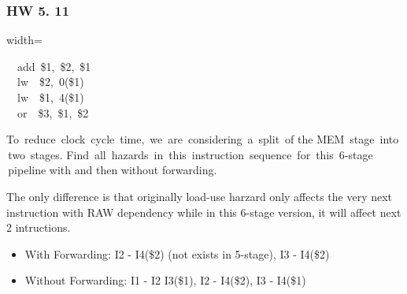\documentclass[xcolor=table]{beamer}
\begin{document}
\begin{mdframe}%

\frametitle{HW 5. 11}\label{heading-sec-hw-5-11}%

\begin{mdblock}{width=}%
\begin{mdpre}%
\noindent~~{add}~\$1,~\$2,~\$1\\
~~{lw}~~\$2,~{0}(\$1)\\
~~{lw}~~\$1,~{4}(\$1)\\
~~{or}~~\$3,~\$1,~\$2%
\end{mdpre}%
\end{mdblock}%

\noindent{} To  reduce  clock  cycle  time,  we  are  considering  a  split  of the MEM  stage  into  two  stages. Find  all  hazards  in  this  instruction  sequence  for  this  6-stage  pipeline with and then without forwarding.%

\mdhr{}%

\noindent{}The only difference is that originally load-use harzard only affects the very next instruction with RAW dependency while in this 6-stage version, it will affect next 2 intructions.%

\begin{itemize}[noitemsep,topsep=\mdcompacttopsep]%

\item{}With Forwarding: I2 - I4(\$2) (not exists in 5-stage), I3 - I4(\$2)%

\item{}Without Forwarding: I1 - I2 I3(\$1), I2 - I4(\$2), I3 - I4(\$1)%
\end{itemize}%
\end{mdframe}\label{sec-hw-5-11}%
\end{document}
